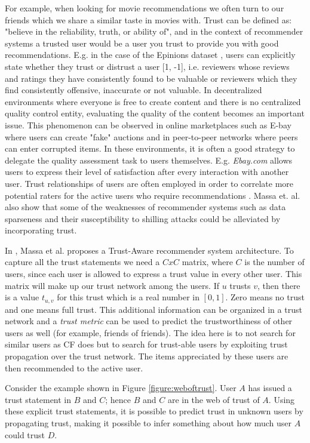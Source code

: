 For example, when looking for movie recommendations we often turn to our friends which we share a similar taste in movies with. Trust can be defined as: "believe in the reliability, truth, or ability of", and in the context of recommender systems a trusted user would be a user you trust to provide you with good recommendations. E.g. in the case of the Epinions dataset \cite{Epinions}, users can explicitly state whether they trust or distrust a user [1, -1], i.e. reviewers whose reviews and ratings they have consistently found to be valuable or reviewers which they find consistently offensive, inaccurate or not valuable. In decentralized environments where everyone is free to create content and there
is no centralized quality control entity, evaluating the quality of the content becomes an important issue. This phenomenon can be observed in online
marketplaces such as E-bay where users can create "fake" auctions and in peer-to-peer networks where peers can enter corrupted items. In these environments, it is often a good strategy to delegate the quality assessment task to users themselves. E.g. \emph{Ebay.com} allows users to express their level of satisfaction after every interaction with another user. Trust relationships of users are often employed in order to correlate more potential raters for the active users who require recommendations \cite{Massa2004, Massa2007}. Massa et. al. \cite{Massa2004} also show that some of the weaknesses of recommender systems such as data sparseness and their susceptibility to shilling attacks could be alleviated by incorporating trust.

In \cite{Massa2004}, Massa et al. proposes a Trust-Aware recommender system
architecture.  To capture all the trust statements we need a $CxC$ matrix,
where $C$ is the number of users, since each user is allowed to express a trust
value in every other user. This matrix will make up our trust network among the
users. If $u$ trusts $v$, then there is a value $t_{u,v}$ for this trust which
is a real number in $[0,1]$. Zero means no trust and one means full trust. This
additional information can be organized in a trust network and a \emph{trust
metric} can be used to predict the trustworthiness of other users as well (for
example, friends of friends). The idea here is to not search for similar users
as CF does but to search for trust-able users by exploiting trust propagation
over the trust network. The items appreciated by these users are then
recommended to the active user.

Consider the example shown in Figure \ref{figure:weboftrust}. User $A$ has
issued a trust statement in $B$ and $C$; hence $B$ and $C$ are in the web of
trust of $A$. Using these explicit trust statements, it is possible to predict
trust in unknown users by propagating trust, making it possible to infer
something about how much user $A$ could trust $D$.

